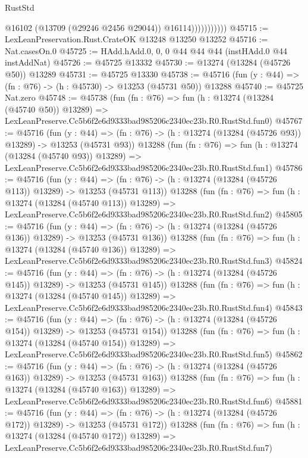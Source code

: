 \begin{lexlean}{RustStd}
\begin{coremodule}
                          @16102
                          (@13709 (@29246 @2456 @29044))
                          @16114)))))))))))
@45715 := LexLeanPreservation.Rust.CrateOK @13248 @13250 @13252
@45716 := Nat.casesOn.{0}
@45725 := HAdd.hAdd.{0, 0, 0} @44 @44 @44 (instHAdd.{0} @44 instAddNat)
@45726 := @45725 @13332
@45730 := @13274 (@13284 (@45726 @50)) @13289
@45731 := @45725 @13330
@45738 := @45716 (fun (y : @44) => (fn : @76) -> (h : @45730) -> @13253 (@45731 @50)) @13288
@45740 := @45725 Nat.zero
@45748 := @45738
    (fun (fn : @76) =>
    fun (h : @13274 (@13284 (@45740 @50)) @13289) =>
    LexLeanPreserve.Cc5b6f2e6d9333bad985206c2340ec23b.R0.RustStd.fun0)
@45767 := @45716
    (fun (y : @44) =>
    (fn : @76) -> (h : @13274 (@13284 (@45726 @93)) @13289) -> @13253 (@45731 @93))
    @13288
    (fun (fn : @76) =>
    fun (h : @13274 (@13284 (@45740 @93)) @13289) =>
    LexLeanPreserve.Cc5b6f2e6d9333bad985206c2340ec23b.R0.RustStd.fun1)
@45786 := @45716
    (fun (y : @44) =>
    (fn : @76) -> (h : @13274 (@13284 (@45726 @113)) @13289) -> @13253 (@45731 @113))
    @13288
    (fun (fn : @76) =>
    fun (h : @13274 (@13284 (@45740 @113)) @13289) =>
    LexLeanPreserve.Cc5b6f2e6d9333bad985206c2340ec23b.R0.RustStd.fun2)
@45805 := @45716
    (fun (y : @44) =>
    (fn : @76) -> (h : @13274 (@13284 (@45726 @136)) @13289) -> @13253 (@45731 @136))
    @13288
    (fun (fn : @76) =>
    fun (h : @13274 (@13284 (@45740 @136)) @13289) =>
    LexLeanPreserve.Cc5b6f2e6d9333bad985206c2340ec23b.R0.RustStd.fun3)
@45824 := @45716
    (fun (y : @44) =>
    (fn : @76) -> (h : @13274 (@13284 (@45726 @145)) @13289) -> @13253 (@45731 @145))
    @13288
    (fun (fn : @76) =>
    fun (h : @13274 (@13284 (@45740 @145)) @13289) =>
    LexLeanPreserve.Cc5b6f2e6d9333bad985206c2340ec23b.R0.RustStd.fun4)
@45843 := @45716
    (fun (y : @44) =>
    (fn : @76) -> (h : @13274 (@13284 (@45726 @154)) @13289) -> @13253 (@45731 @154))
    @13288
    (fun (fn : @76) =>
    fun (h : @13274 (@13284 (@45740 @154)) @13289) =>
    LexLeanPreserve.Cc5b6f2e6d9333bad985206c2340ec23b.R0.RustStd.fun5)
@45862 := @45716
    (fun (y : @44) =>
    (fn : @76) -> (h : @13274 (@13284 (@45726 @163)) @13289) -> @13253 (@45731 @163))
    @13288
    (fun (fn : @76) =>
    fun (h : @13274 (@13284 (@45740 @163)) @13289) =>
    LexLeanPreserve.Cc5b6f2e6d9333bad985206c2340ec23b.R0.RustStd.fun6)
@45881 := @45716
    (fun (y : @44) =>
    (fn : @76) -> (h : @13274 (@13284 (@45726 @172)) @13289) -> @13253 (@45731 @172))
    @13288
    (fun (fn : @76) =>
    fun (h : @13274 (@13284 (@45740 @172)) @13289) =>
    LexLeanPreserve.Cc5b6f2e6d9333bad985206c2340ec23b.R0.RustStd.fun7)

\end{coremodule}
\end{lexlean}
